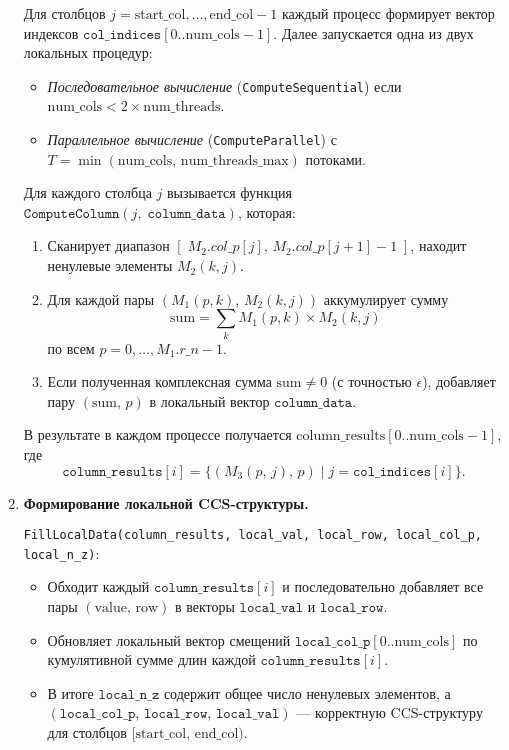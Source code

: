 \documentclass[12pt]{article}
\begin{document}
\begin{enumerate}
    Для столбцов \(j = \text{start\_col}, \dots, \text{end\_col} - 1\) каждый процесс формирует вектор индексов \(\texttt{col\_indices}[0..\text{num\_cols}-1]\). Далее запускается одна из двух локальных процедур:
    \begin{itemize}
        \item \emph{Последовательное вычисление} (\texttt{ComputeSequential}) если \(\text{num\_cols} < 2\times\text{num\_threads}\).
        \item \emph{Параллельное вычисление} (\texttt{ComputeParallel}) с \(T = \min(\text{num\_cols},\,\text{num\_threads\_max})\) потоками.
    \end{itemize}
    
    \subitem Для каждого столбца \(j\) вызывается функция \(\texttt{ComputeColumn}(j,\;\texttt{column\_data})\), которая:
    \begin{enumerate}
        \item Сканирует диапазон \([\;M_2.col\_p[j],\,M_2.col\_p[j+1]-1\;]\), находит ненулевые элементы \(M_2(k,j)\).
        \item Для каждой пары \((M_1(p,k),\,M_2(k,j))\) аккумулирует сумму
        \[
            \text{sum} = \sum_{k} M_1(p,k)\times M_2(k,j)
        \]
        по всем \(p = 0,\dots,M_1.r\_n-1\). 
        \item Если полученная комплексная сумма \(\text{sum}\neq 0\) (с точностью \(\epsilon\)), добавляет пару \((\text{sum},\,p)\) в локальный вектор \(\texttt{column\_data}\).
    \end{enumerate}
    В результате в каждом процессе получается \(\text{column\_results}[0..\text{num\_cols}-1]\), где 
    \[
        \texttt{column\_results}[i] = \{ (M_3(p,\,j),\,p) \mid j = \texttt{col\_indices}[i]\}.
    \]
    
    \item \textbf{Формирование локальной CCS-структуры.}
    
    \texttt{FillLocalData(column\_results,\,local\_val,\,local\_row,\,local\_col\_p,\,local\_n\_z)}:
    \begin{itemize}
        \item Обходит каждый \(\texttt{column\_results}[i]\) и последовательно добавляет все пары \((\text{value},\,\text{row})\) в векторы \(\texttt{local\_val}\) и \(\texttt{local\_row}\).
        \item Обновляет локальный вектор смещений \(\texttt{local\_col\_p}[0..\text{num\_cols}]\) по кумулятивной сумме длин каждой \(\texttt{column\_results}[i]\).
        \item В итоге \(\texttt{local\_n\_z}\) содержит общее число ненулевых элементов, а \((\texttt{local\_col\_p},\,\texttt{local\_row},\,\texttt{local\_val})\) — корректную CCS-структуру для столбцов \([\text{start\_col},\,\text{end\_col})\).
    \end{itemize}


\end{enumerate}
\end{document}
